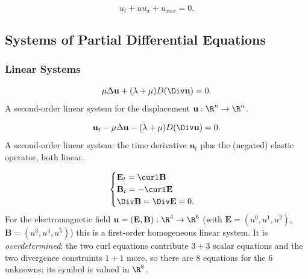 \begin{example}
\label{ex:kdv-equation}
\leanok
$$u_t + uu_x + u_{xxx} = 0.$$
\end{example}

\subsection{Systems of Partial Differential Equations}
\label{sec:systems-of-pdes}

\subsubsection{Linear Systems}
\label{sec:examples-linear-systems}

\begin{example}
\label{ex:linear-elasticity-equilibrium}
\leanok
$$\mu\Delta\mathbf{u} + (\lambda + \mu)D(\Div \mathbf{u}) = 0.$$
A second-order linear system for the displacement $\mathbf{u} : \R^n \to \R^n$.
\end{example}

\begin{example}
\label{ex:linear-elasticity-evolution}
\leanok
$$\mathbf{u}_t - \mu\Delta\mathbf{u} - (\lambda + \mu)D(\Div \mathbf{u}) = 0.$$
A second-order linear system: the time derivative $\mathbf{u}_t$ plus the (negated) elastic operator, both linear.
\end{example}

\begin{example}
\label{ex:maxwells-equations}
\leanok
$$\begin{cases}
\mathbf{E}_t = \curl \mathbf{B} \\
\mathbf{B}_t = -\curl \mathbf{E} \\
\Div \mathbf{B} = \Div \mathbf{E} = 0.
\end{cases}$$
For the electromagnetic field $\mathbf{u} = (\mathbf{E}, \mathbf{B}) : \R^4 \to \R^6$ (with $\mathbf{E} = (u^0,u^1,u^2)$, $\mathbf{B} = (u^3,u^4,u^5)$) this is a first-order homogeneous linear system. It is \emph{overdetermined}: the two curl equations contribute $3+3$ scalar equations and the two divergence constraints $1+1$ more, so there are $8$ equations for the $6$ unknowns; its symbol is valued in $\R^8$.
\end{example}

